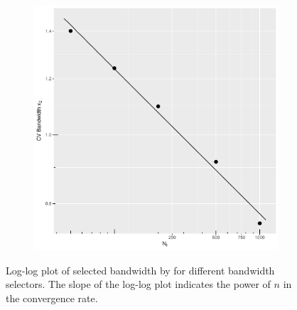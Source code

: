 \begin{figure}[htbp]
\begin{subfigure}[t]{0.195\textwidth}
    \end{subfigure}
    \begin{subfigure}[t]{0.195\textwidth}
        \centering
        \includegraphics[width=\textwidth]{results/by_h_per_mu/cv_bandwidth_x2_vs_mu.pdf}
    \end{subfigure}
    \caption[Selected bandwidth by ]
        {Log-log plot of selected bandwidth by  for different bandwidth selectors.
        The slope of the log-log plot indicates the power of $n$ in the convergence rate.}
    \label{fig:results:bandwidth_by_incidents}    
\end{figure}

